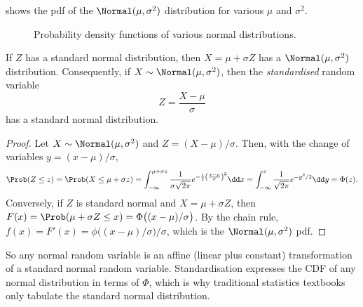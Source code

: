  shows the pdf of the $\Normal(\mu, \sigma^2)$ distribution for various $\mu$ and $\sigma^2$.

\begin{figure}[ht]
\centering
{}
\caption{Probability density functions of various normal distributions.}
\label{fig:normal-pdfs}
\end{figure}


\begin{theorem}[Standardisation]\label{thm:standardisation}
If $Z$ has a standard normal distribution, then $X = \mu + \sigma Z$ has a $\Normal(\mu, \sigma^2)$ distribution. Consequently, if $X \sim \Normal(\mu, \sigma^2)$, then the \emph{standardised} random variable
\[
  Z = \frac{X - \mu}{\sigma}
\]
has a standard normal distribution.
\end{theorem}

\begin{proof}
Let $X \sim \Normal(\mu, \sigma^2)$ and $Z = (X - \mu)/\sigma$. Then, with the change of variables $y = (x - \mu)/\sigma$,
\[
  \Prob(Z \le z) = \Prob(X \le \mu + \sigma z) = \int_{-\infty}^{\mu + \sigma z} \frac{1}{\sigma\sqrt{2\pi}} e^{-\frac12 \left(\frac{x-\mu}{\sigma}\right)^2} \dd x = \int_{-\infty}^z \frac{1}{\sqrt{2\pi}} e^{-y^2/2} \dd y = \Phi(z).
\]
Conversely, if $Z$ is standard normal and $X = \mu + \sigma Z$, then $F(x) = \Prob(\mu + \sigma Z \le x) = \Phi\bigl((x - \mu)/\sigma\bigr)$. By the chain rule, $f(x) = F'(x) = \phi\bigl((x - \mu)/\sigma\bigr)/\sigma$, which is the $\Normal(\mu, \sigma^2)$ pdf.
\end{proof}

So any normal random variable is an affine (linear plus constant) transformation of a standard normal random variable. Standardisation expresses the CDF of any normal distribution in terms of $\Phi$, which is why traditional statistics textbooks only tabulate the standard normal distribution.

